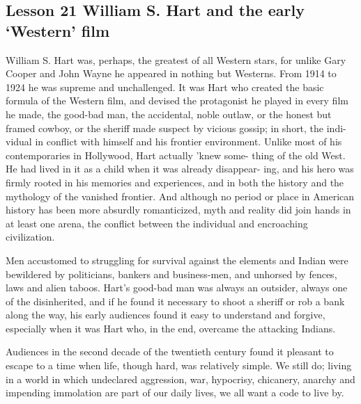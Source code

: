 \documentclass[kindlepaper]{BHCexam4kindle}
\begin{document}
\subsection{Lesson 21
William S. Hart and the early ‘Western' film}
\par
William S. Hart was, perhaps, the greatest of all Western stars, for unlike Gary
Cooper and John Wayne he appeared in nothing but Westerns. From 1914 to
1924 he was supreme and unchallenged. It was Hart who created the basic
formula of the Western film, and devised the protagonist he played in every film
he made, the good-bad man, the accidental, noble outlaw, or the honest but
framed cowboy, or the sheriff made suspect by vicious gossip; in short, the indi-
vidual in conflict with himself and his frontier environment.
Unlike most of his contemporaries in Hollywood, Hart actually 'knew some-
thing of the old West. He had lived in it as a child when it was already disappear-
ing, and his hero was firmly rooted in his memories and experiences, and in both
the history and the mythology of the vanished frontier. And although no period
or place in American history has been more absurdly romanticized, myth and
reality did join hands in at least one arena, the conflict between the individual
and encroaching civilization.
\par
Men accustomed to struggling for survival against the elements and Indian
were bewildered by politicians, bankers and business-men, and unhorsed by
fences, laws and alien taboos. Hart's good-bad man was always an outsider,
always one of the disinherited, and if he found it necessary to shoot a sheriff or
rob a bank along the way, his early audiences found it easy to understand and
forgive, especially when it was Hart who, in the end, overcame the attacking
Indians.
\par
Audiences in the second decade of the twentieth century found it pleasant to
escape to a time when life, though hard, was relatively simple. We still do; living
in a world in which undeclared aggression, war, hypocrisy, chicanery, anarchy
and impending immolation are part of our daily lives, we all want a code to
live by.
\clearpage
\end{document}
